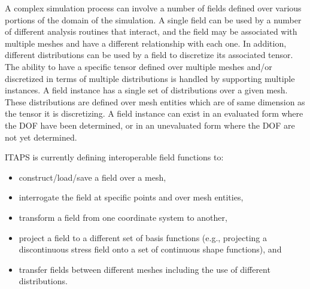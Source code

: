 A complex simulation process can involve a number of fields defined
over various portions of the domain of the simulation. A single field
can be used by a number of different analysis routines that interact,
and the field may be associated with multiple meshes and have
a different relationship with each one.
In addition, different
distributions can be used by a field to discretize its associated
tensor. The ability to have a specific tensor defined over multiple
meshes and/or discretized in terms of multiple distributions is
handled by supporting multiple instances. A field instance has a
single set of distributions over a given mesh. These distributions are
defined over mesh entities which are of same dimension as the tensor
it is discretizing. A field instance can exist in an evaluated form
where the DOF have been determined, or in an unevaluated form where
the DOF are not yet determined.

ITAPS is currently defining interoperable field functions to:
\begin{itemize}
\item construct/load/save a field over a mesh,
\item interrogate the field at specific points and over mesh entities,
\item transform a field from one coordinate system to another,
\item project a field to a different set of basis functions (e.g., projecting a discontinuous 
stress field onto a set of continuous shape functions), and
\item transfer fields between different meshes including the use of different distributions. 
\end{itemize}





